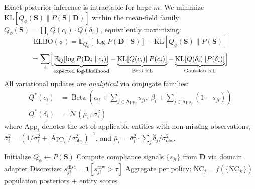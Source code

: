\documentclass[letterpaper]{article}
\begin{document}
Exact posterior inference is intractable for large $m$. We minimize
$\mathrm{KL}[Q_\phi(\mathbf{S}) \| P(\mathbf{S} \mid \mathbf{D})]$
within the mean-field family
$Q_\phi(\mathbf{S}) = \prod_i Q(c_i) \cdot Q(\delta_i)$,
equivalently maximizing:
\[
  \mathrm{ELBO}(\phi) = \mathbb{E}_{Q_\phi}[\log P(\mathbf{D} \mid \mathbf{S})]
  - \mathrm{KL}[Q_\phi(\mathbf{S}) \| P(\mathbf{S})]
\]
\[
  = \sum_i \Bigl[\underbrace{\mathbb{E}_{Q}[\log P(\mathbf{D}_i \mid c_i)]}_{\text{expected log-likelihood}}
  - \underbrace{\mathrm{KL}[Q(c_i) \| P(c_i)]}_{\text{Beta KL}}
  - \underbrace{\mathrm{KL}[Q(\delta_i) \| P(\delta_i)]}_{\text{Gaussian KL}}\Bigr]
\]
All variational updates are \emph{analytical} via conjugate families:
\begin{align*}
  Q^*(c_i) &= \operatorname{Beta}\!\left(\alpha_i + \textstyle\sum_{j \in \mathrm{App}_i} s_{ji},\;
               \beta_i + \textstyle\sum_{j \in \mathrm{App}_i} (1 - s_{ji})\right) \\
  Q^*(\delta_i) &= \mathcal{N}(\bar{\mu}_i,\, \bar{\sigma}_i^2)
\end{align*}
where $\mathrm{App}_i$ denotes the set of applicable entities with
non-missing observations,
$\bar{\sigma}_i^2 = (1/\sigma_i^2 + |\mathrm{App}_i|/\sigma_{\mathrm{obs}}^2)^{-1}$,
and $\bar{\mu}_i = \bar{\sigma}_i^2 \cdot \sum_j \hat{\delta}_j / \sigma_{\mathrm{obs}}^2$.

\begin{algorithm}[H]
\SetAlgoLined
{}
Initialize $Q_\phi \leftarrow P(\mathbf{S})$\;
Compute compliance signals $\{s_{ji}\}$ from $\mathbf{D}$ via domain adapter\;
Discretize: $s_{ji}^{\mathrm{disc}} = \mathbf{1}[s_{ji}^{\mathrm{raw}} > \tau]$\;
Aggregate per policy: $\mathrm{NC}_j = f(\{\mathrm{NC}_{ji}\})$
\Return population posteriors + entity scores
\caption{RSI: Rule-State Inference (Two-Level Architecture)}
\label{alg:rsi}
\end{algorithm}
\end{document}
